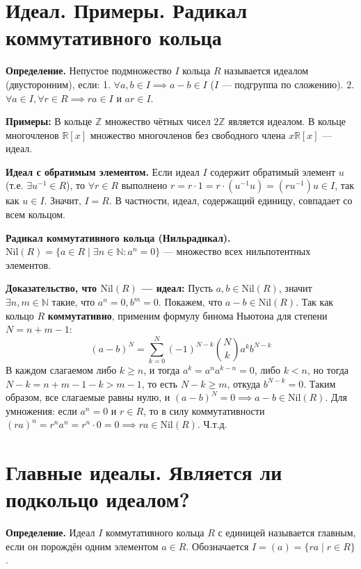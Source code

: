 \documentclass[12pt, a4paper]{article}
\theoremstyle{definition}
\theoremstyle{remark}
\begin{document}
\section{Идеал. Примеры. Радикал коммутативного кольца}
\textbf{Определение.} Непустое подмножество $I$ кольца $R$ называется идеалом (двусторонним), если:
1. $\forall a, b \in I \implies a - b \in I$ ($I$ — подгруппа по сложению).
2. $\forall a \in I, \forall r \in R \implies ra \in I$ и $ar \in I$.

\textbf{Примеры:} В кольце $\mathbb{Z}$ множество чётных чисел $2\mathbb{Z}$ является идеалом. В кольце многочленов $\mathbb{R}[x]$ множество многочленов без свободного члена $x\mathbb{R}[x]$ — идеал.

\textbf{Идеал с обратимым элементом.} Если идеал $I$ содержит обратимый элемент $u$ (т.е. $\exists u^{-1} \in R$), то $\forall r \in R$ выполнено $r = r \cdot 1 = r \cdot (u^{-1} u) = (r u^{-1}) u \in I$, так как $u \in I$. Значит, $I = R$. В частности, идеал, содержащий единицу, совпадает со всем кольцом.

\textbf{Радикал коммутативного кольца (Нильрадикал).} $\text{Nil}(R) = \{a \in R \mid \exists n \in \mathbb{N} : a^n = 0\}$ — множество всех нильпотентных элементов.

\textbf{Доказательство, что $\text{Nil}(R)$ — идеал:}
Пусть $a, b \in \text{Nil}(R)$, значит $\exists n, m \in \mathbb{N}$ такие, что $a^n = 0, b^m = 0$. 
Покажем, что $a-b \in \text{Nil}(R)$. Так как кольцо $R$ \textbf{коммутативно}, применим формулу бинома Ньютона для степени $N = n + m - 1$:
$$ (a - b)^N = \sum_{k=0}^{N} (-1)^{N-k} \binom{N}{k} a^k b^{N-k} $$
В каждом слагаемом либо $k \geq n$, и тогда $a^k = a^n a^{k-n} = 0$, либо $k < n$, но тогда $N - k = n + m - 1 - k > m - 1$, то есть $N - k \geq m$, откуда $b^{N-k} = 0$. Таким образом, все слагаемые равны нулю, и $(a-b)^N = 0 \implies a-b \in \text{Nil}(R)$.
Для умножения: если $a^n = 0$ и $r \in R$, то в силу коммутативности $(ra)^n = r^n a^n = r^n \cdot 0 = 0 \implies ra \in \text{Nil}(R)$. Ч.т.д.
\section{Главные идеалы. Является ли подкольцо идеалом?}


\textbf{Определение.} Идеал $I$ коммутативного кольца $R$ с единицей называется главным, если он порождён одним элементом $a \in R$. Обозначается $I = (a) = \{ ra \mid r \in R \}$.
\end{document}

